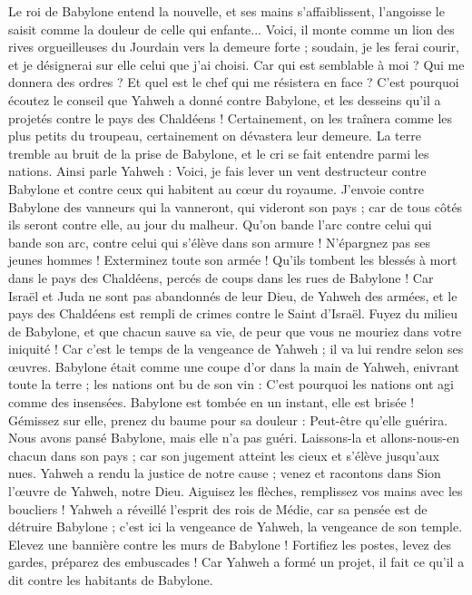 \begin{multicols}{2}
Le roi de Babylone entend la nouvelle, et ses mains s'affaiblissent, l'angoisse le saisit comme la douleur de celle qui enfante...
Voici, il monte comme un lion des rives orgueilleuses du Jourdain vers la demeure forte ;  soudain, je les ferai courir, et je désignerai sur elle celui que j'ai choisi. Car qui est semblable à moi ? Qui me donnera des ordres ? Et quel est le chef qui me résistera en face ?
C'est pourquoi écoutez le conseil que Yahweh a donné contre Babylone, et les desseins qu'il a projetés contre le pays des Chaldéens ! Certainement, on les traînera comme les plus petits du troupeau, certainement on dévastera leur demeure.
La terre tremble au bruit de la prise de Babylone, et le cri se fait entendre parmi les nations.
\VerseOne{}Ainsi parle Yahweh : Voici, je fais lever un vent destructeur contre Babylone et contre ceux qui habitent au cœur du royaume.
J'envoie contre Babylone des vanneurs qui la vanneront, qui videront son pays ; car de tous côtés ils seront contre elle, au jour du malheur.
Qu'on bande l'arc contre celui qui bande son arc, contre celui qui s'élève dans son armure ! N’épargnez pas ses jeunes hommes ! Exterminez toute son armée !
Qu’ils tombent les blessés à mort dans le pays des Chaldéens, percés de coups dans les rues de Babylone !
Car Israël et Juda ne sont pas abandonnés de leur Dieu, de Yahweh des armées, et le pays des Chaldéens est rempli de crimes contre le Saint d'Israël.
Fuyez du milieu de Babylone, et que chacun sauve sa vie, de peur que vous ne mouriez dans votre iniquité ! Car c'est le temps de la vengeance de Yahweh ; il va lui rendre selon ses œuvres.
Babylone était comme une coupe d'or dans la main de Yahweh, enivrant toute la terre ; les nations ont bu de son vin : C'est pourquoi les nations ont agi comme des insensées.
Babylone est tombée en un instant, elle est brisée ! Gémissez sur elle, prenez du baume pour sa douleur : Peut-être qu'elle guérira.
Nous avons pansé Babylone, mais elle n'a pas guéri. Laissons-la et allons-nous-en chacun dans son pays ; car son jugement atteint les cieux et s'élève jusqu’aux nues.
Yahweh a rendu la justice de notre cause ; venez et racontons dans Sion l'œuvre de Yahweh, notre Dieu.
Aiguisez les flèches, remplissez vos mains avec les boucliers ! Yahweh a réveillé l'esprit des rois de Médie, car sa pensée est de détruire Babylone ; c'est ici la vengeance de Yahweh, la vengeance de son temple.
Elevez une bannière contre les murs de Babylone ! Fortifiez les postes, levez des gardes, préparez des embuscades ! Car Yahweh a formé un projet, il fait ce qu'il a dit contre les habitants de Babylone.

\end{multicols}

